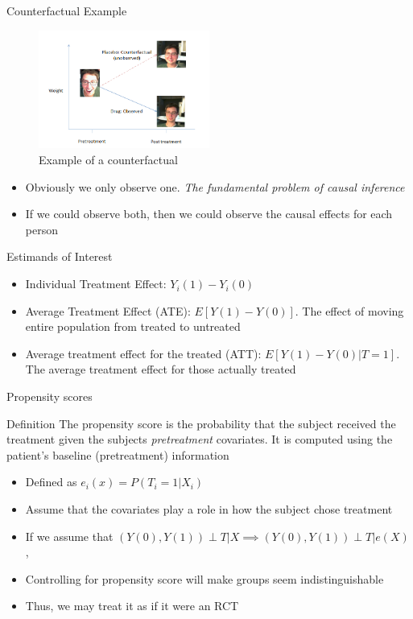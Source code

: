   
\begin{frame}{Counterfactual Example}
   \begin{figure}[h!]
  \centering
    \includegraphics[width=0.5\textwidth]{counterfactual.png}
    \caption{Example of a counterfactual}
\label{fig:counterfactual}
\end{figure}

\begin{itemize}
 \item Obviously we only observe one. \textit{The fundamental problem of causal inference}
\item If we could observe both, then we could observe the causal effects for each person
\end{itemize}
\end{frame}

\begin{frame}{Estimands of Interest}
 \begin{itemize}
 \item Individual Treatment Effect: $Y_i(1)-Y_i(0)$
 \item Average Treatment Effect (ATE): $E[Y(1)-Y(0)]$. The effect of moving entire population
 from treated to untreated
 \item Average treatment effect for the treated (ATT): $E[Y(1)-Y(0)|T=1]$. The average treatment
 effect for those actually treated
\end{itemize}
 
\end{frame}


\begin{frame}{Propensity scores}
\begin{block}{Definition}
The propensity score is the probability that the subject received the treatment given the subjects \textit{pretreatment}
covariates. It is computed using the patient's baseline (pretreatment) information \cite{Rosenbaum1983}
\end{block}
 \begin{itemize}
  \item Defined as  $e_i(x)=P(T_i =1 |X_i)$
  \item Assume that the covariates play a role in how the subject chose treatment
  \item If we assume that $(Y(0),Y(1))\perp T|X \implies (Y(0),Y(1))\perp T|e(X)$, \cite{Rosenbaum1983}
  \item Controlling for propensity score will make groups seem indistinguishable
  \item Thus, we may treat it as if it were an RCT
 \end{itemize}

\end{frame}

